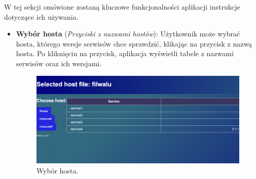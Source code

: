 W tej sekcji omówione zostaną kluczowe funkcjonalności aplikacji instrukcje dotyczące ich używania.

\begin{itemize}
    \item \textbf{Wybór hosta} (\textit{Przyciski z nazwami hostów}):
    Użytkownik może wybrać hosta, którego wersje serwisów chce sprawdzić, klikając na przycisk z nazwą hosta. Po kliknięciu na przycisk, aplikacja wyświetli tabele z nazwami serwisów oraz ich wersjami.
    \begin{figure}[H]
    \centering
    \includegraphics[width=\textwidth]{photos/diffHost.png}
    \caption{Wybór hosta.}
    \end{figure}


\end{itemize}
